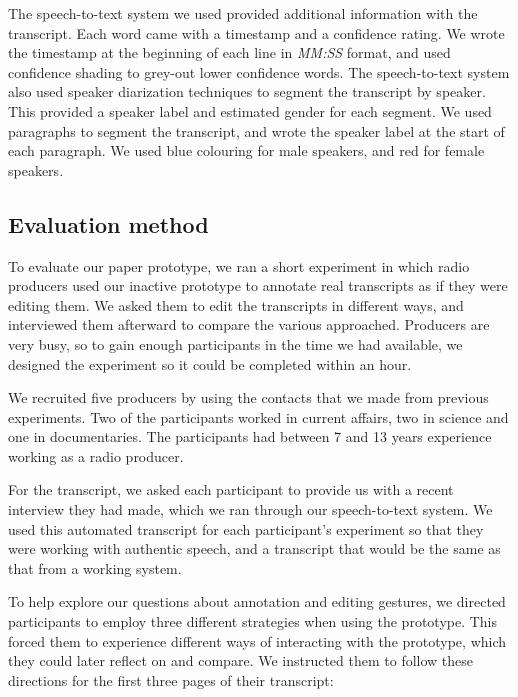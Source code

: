 The speech-to-text system we used provided additional information with the transcript.  Each word came with a timestamp
and a confidence rating. We wrote the timestamp at the beginning of each line in \textit{MM:SS} format, and used
confidence shading to grey-out lower confidence words.  The speech-to-text system also used speaker diarization
techniques to segment the transcript by speaker. This provided a speaker label and estimated gender for each segment.
We used paragraphs to segment the transcript, and wrote the speaker label at the start of each paragraph. We used blue
colouring for male speakers, and red for female speakers.

\subsection{Evaluation method}




To evaluate our paper prototype, we ran a short experiment in which radio producers used our inactive prototype to
annotate real transcripts as if they were editing them.  We asked them to edit the transcripts in different ways, and
interviewed them afterward to compare the various approached. Producers are very busy, so to gain enough participants
in the time we had available, we designed the experiment so it could be completed within an hour.

We recruited five producers by using the contacts that we made from previous experiments. Two of the participants
worked in current affairs, two in science and one in documentaries.  The participants had between 7 and 13 years
experience working as a radio producer.

For the transcript, we asked each participant to provide us with a recent interview they had made, which we ran through
our speech-to-text system. We used this automated transcript for each participant's experiment so that they were
working with authentic speech, and a transcript that would be the same as that from a working system.

To help explore our questions about annotation and editing gestures, we directed participants to employ three different
strategies when using the prototype. This forced them to experience different ways of interacting with the prototype,
which they could later reflect on and compare. We instructed them to follow these directions for the first three
pages of their transcript: 

